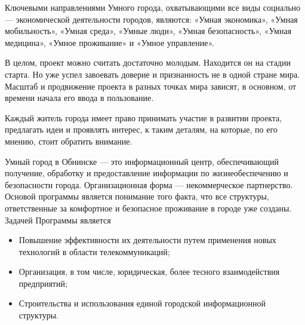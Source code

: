 Ключевыми направлениями Умного города, охватывающими все виды социально --- экономической деятельности городов, являются: «Умная экономика», «Умная мобильность», «Умная среда», «Умные люди», «Умная безопасность», «Умная медицина», «Умное проживание» и «Умное управление». 

В целом, проект можно считать достаточно молодым. Находится он на стадии старта. Но уже успел завоевать доверие и признанность не в одной стране мира. Масштаб и продвижение проекта в разных точках мира зависят, в основном, от времени начала его ввода в пользование. 

Каждый житель города имеет право принимать участие в развитии проекта, предлагать идеи и проявлять интерес, к таким деталям, на которые, по его мнению, стоит обратить внимание. 

Умный город в Обнинске --- это информационный центр, обеспечивающий получение, обработку и предоставление информации по жизнеобеспечению и безопасности города. Организационная форма --- некоммерческое партнерство. Основой программы является понимание того факта, что все структуры, ответственные за комфортное и безопасное проживание в городе уже созданы. Задачей Программы является 
\begin{itemize}
	\item Повышение эффективности их деятельности путем применения новых технологий в области телекоммуникаций; 	\item Организация, в том числе, юридическая, более тесного взаимодействия предприятий; 
	\item Строительства и использования единой городской информационной структуры.
\end{itemize}